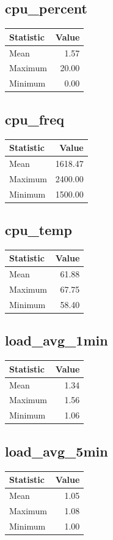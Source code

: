 \documentclass[11pt]{article}
\begin{document}
\subsection{cpu_percent}
\begin{tabular}{lr}
\toprule
Statistic & Value \\
\midrule
Mean & 1.57 \\
Maximum & 20.00 \\
Minimum & 0.00 \\
\bottomrule
\end{tabular}


\subsection{cpu_freq}
\begin{tabular}{lr}
\toprule
Statistic & Value \\
\midrule
Mean & 1618.47 \\
Maximum & 2400.00 \\
Minimum & 1500.00 \\
\bottomrule
\end{tabular}


\subsection{cpu_temp}
\begin{tabular}{lr}
\toprule
Statistic & Value \\
\midrule
Mean & 61.88 \\
Maximum & 67.75 \\
Minimum & 58.40 \\
\bottomrule
\end{tabular}


\subsection{load_avg_1min}
\begin{tabular}{lr}
\toprule
Statistic & Value \\
\midrule
Mean & 1.34 \\
Maximum & 1.56 \\
Minimum & 1.06 \\
\bottomrule
\end{tabular}


\subsection{load_avg_5min}
\begin{tabular}{lr}
\toprule
Statistic & Value \\
\midrule
Mean & 1.05 \\
Maximum & 1.08 \\
Minimum & 1.00 \\
\bottomrule
\end{tabular}
\end{document}
